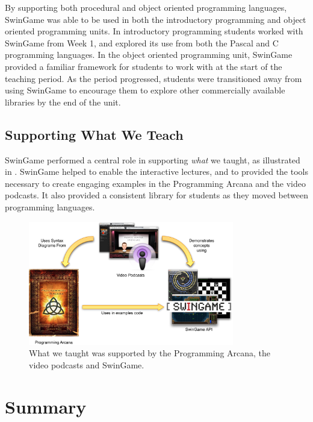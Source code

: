By supporting both procedural and object oriented programming languages, SwinGame was able to be used in both the introductory programming and object oriented programming units. In introductory programming students worked with SwinGame from Week 1, and explored its use from both the Pascal and C programming languages. In the object oriented programming unit, SwinGame provided a familiar framework for students to work with at the start of the teaching period. As the period progressed, students were transitioned away from using SwinGame to encourage them to explore other commercially available libraries by the end of the unit.

\subsection{Supporting What We Teach} %
\label{sub:supporting_what_we_teach}

SwinGame performed a central role in supporting \emph{what} we taught, as illustrated in . SwinGame helped to enable the interactive lectures, and to provided the tools necessary to create engaging examples in the Programming Arcana and the video podcasts. It also provided a consistent library for students as they moved between programming languages.

\begin{figure}[thb]
  \centering
  \includegraphics[width=0.8\textwidth]{SupportWhatWeTeach}
  \caption{What we taught was supported by the Programming Arcana, the video podcasts and SwinGame.}
  \label{fig:what_we_teach}
\end{figure}



\clearpage
\section{Summary} %
\label{sec:supporting_summary}

